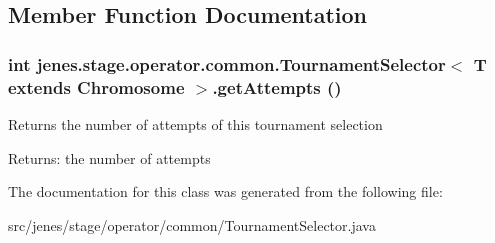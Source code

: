 \subsection{Member Function Documentation}
\hypertarget{classjenes_1_1stage_1_1operator_1_1common_1_1_tournament_selector_3_01_t_01extends_01_chromosome_01_4_93a5d890bc7a8f383bda9791baf0460c}{
\subsubsection[getAttempts]{\setlength{\rightskip}{0pt plus 5cm}int jenes.stage.operator.common.TournamentSelector$<$ T extends Chromosome $>$.getAttempts ()}}
\label{classjenes_1_1stage_1_1operator_1_1common_1_1_tournament_selector_3_01_t_01extends_01_chromosome_01_4_93a5d890bc7a8f383bda9791baf0460c}


Returns the number of attempts of this tournament selection 

\begin{Desc}
\item[Returns:]the number of attempts \end{Desc}


The documentation for this class was generated from the following file:\begin{CompactItemize}
\item 
src/jenes/stage/operator/common/TournamentSelector.java\end{CompactItemize}
